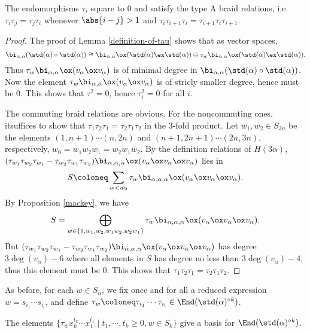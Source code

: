 \begin{lemma}
    The endomorphisms $\tau_i$ square to $0$ and satisfy the type 
    A braid relations, i.e. $\tau_i\tau_j = \tau_j\tau_i$ whenever
    $\abs{i-j}>1$ and $\tau_i\tau_{i+1}\tau_i = \tau_{i+1}\tau_i\tau_{i+1}$.
\end{lemma}

\begin{proof}
    The proof of Lemma \ref{definition-of-tau} shows that 
    as vector spaces, 
    \[
        \bi_{\alpha,\alpha}(\std(\alpha)\circ\std(\alpha))
        \cong\bi_{\alpha,\alpha}\ox(\std(\alpha)\ex\std(\alpha))
        \oplus\tau_w\bi_{\alpha,\alpha}\ox(\std(\alpha)\ex\std(\alpha)).
    \]
    Thus $\tau_w\bi_{\alpha,\alpha}\ox(v_\alpha\ox v_\alpha)$ is of
    minimal degree in $\bi_{\alpha,\alpha}(\std(\alpha)\circ\std(\alpha))$.
    Now the element $\tau_w\bi_{\alpha,\alpha}\ox(v_\alpha\ox v_\alpha)$ is of
    stricly smaller degree, hence must be $0$. This shows that
    $\tau^2 = 0$, hence $\tau_i^2 = 0$ for all $i$.

    The commuting braid relations are obvious. For the noncommuting ones,
    itsuffices to show that $\tau_1\tau_2\tau_1 = \tau_2\tau_1\tau_2$
    in the 3-fold product. Let $w_1,w_2\in S_{3n}$ be the elements
    $(1,n+1)\cdots(n,2n)$ and $(n+1,2n+1)\cdots(2n,3n)$, respectively,
    $w_0 = w_1w_2w_1 = w_2w_1w_2$. By the definition relations of $H(3\alpha)$,
    $(\tau_{w_1}\tau_{w_2}\tau_{w_1}-\tau_{w_2}\tau_{w_1}\tau_{w_2})
    \bi_{\alpha,\alpha,\alpha}\ox(v_\alpha\ox v_\alpha\ox v_\alpha)$
    lies in $$S \coloneq  \sum_{w<w_0}\tau_w\bi_{\alpha,\alpha,\alpha}\ox
    (v_\alpha\ox v_\alpha\ox v_\alpha).$$ By Proposition \ref{mackey},
    we have 
    \[
        S = \bigoplus_{w\in\{1,w_1,w_2,w_1w_2,w_2w_1\}}
        \tau_w\bi_{\alpha,\alpha,\alpha}\ox
        (v_\alpha\ox v_\alpha\ox v_\alpha).
    \] 
    But 
    $(\tau_{w_1}\tau_{w_2}\tau_{w_1}-\tau_{w_2}\tau_{w_1}\tau_{w_2})
    \bi_{\alpha,\alpha,\alpha}\ox(v_\alpha\ox v_\alpha\ox v_\alpha)$
    has degree $3\deg(v_\alpha)-6$ where all elements in $S$
    has degree no less than $3\deg(v_\alpha)-4$, thus
    this element must be $0$. This shows that $\tau_1\tau_2\tau_1
     = \tau_2\tau_1\tau_2$.
\end{proof}

As before, for each $w\in S_n$, we fix once and for all a reduced expression $w = s_{i_1}\cdots s_{i_l}$,
and define $\tau_w \coloneq  \tau_{i_1}\cdots\tau_{i_l}\in\End(\std(\alpha)^{\circ k})$.

\begin{lemma}
    The elements $\{\tau_w x_k^{t_k}\cdots x_1^{t_1}\mid t_1,\cdots,t_k\ge 0,
    w\in S_k\}$ give a basis for $\End(\std(\alpha)^{\circ k})$.
\end{lemma}


